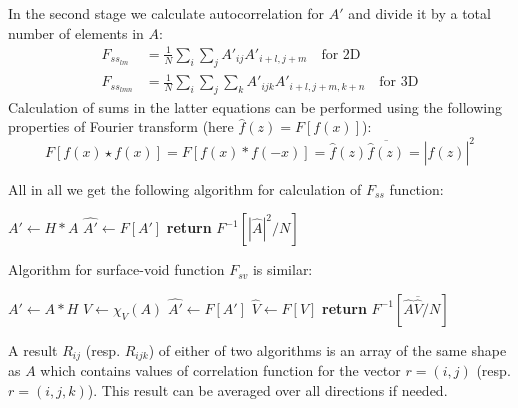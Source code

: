 \documentclass[reprint,amsmath,amssymb,aps,pre,showkeys,showpacs]{revtex4-1}
\begin{document}
In the second stage we calculate autocorrelation for $A'$ and divide it by a
total number of elements in $A$:
\begin{align*}
  F_{{ss}_{lm}} &= \frac{1}{N} \sum_i \sum_j A'_{ij}A'_{i+l, j+m} \quad
  \text{for 2D} \\
  F_{{ss}_{lmn}} &= \frac{1}{N} \sum_i \sum_j \sum_k A'_{ijk}A'_{i+l, j+m, k+n}
  \quad \text{for 3D}
\end{align*}
Calculation of sums in the latter equations can be performed using the following
properties of Fourier transform (here $\hat{f}(z) = F[f(x)]$):
\begin{equation*}
  F[f(x) \star f(x)] = F[f(x) * f(-x)] = \hat{f}(z)\overline{\hat{f}(z)} = |\hat{f}(z)|^2
\end{equation*}

All in all we get the following algorithm for calculation of $F_{ss}$ function:
\begin{algorithmic}[1]
  \State $A' \gets H*A$
  \State $\hat{A'} \gets F[A']$
  \State \textbf{return} $F^{-1}[ |\hat{A}|^2 / N]$
  \EndProcedure
\end{algorithmic}

Algorithm for surface-void function $F_{sv}$ is similar:
\begin{algorithmic}[1]
  \State $A' \gets A*H$
  \State $V \gets \chi_V(A)$
  \State $\hat{A'} \gets F[A']$
  \State $\hat{V} \gets F[V]$
  \State \textbf{return} $F^{-1}[ \hat{A}\overline{\hat{V}} / N]$
  \EndProcedure
\end{algorithmic}

A result $R_{ij}$ (resp. $R_{ijk}$) of either of two algorithms is an array of
the same shape as $A$ which contains values of correlation function for the
vector $r = (i, j)$ (resp. $r = (i, j, k)$). This result can be averaged over
all directions if needed.
\end{document}
